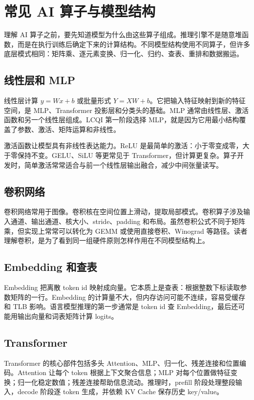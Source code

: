 \chapter{常见 AI 算子与模型结构}

理解 AI 算子之前，要先知道模型为什么由这些算子组成。推理引擎不是随意堆函数，而是在执行训练后确定下来的计算结构。不同模型结构使用不同算子，但许多底层模式相同：矩阵乘、逐元素变换、归一化、归约、查表、重排和数据搬运。

\section{线性层和 MLP}

线性层计算 $y = Wx + b$ 或批量形式 $Y = XW + b$。它把输入特征映射到新的特征空间，是 MLP、Transformer 投影层和分类头的基础。MLP 通常由线性层、激活函数和另一个线性层组成。LCQI 第一阶段选择 MLP，就是因为它用最小结构覆盖了参数、激活、矩阵运算和非线性。

激活函数让模型具有非线性表达能力。ReLU 是最简单的激活：小于零变成零，大于零保持不变。GELU、SiLU 等更常见于 Transformer，但计算更复杂。算子开发时，简单激活常常适合与前一个线性层输出融合，减少中间张量读写。

\section{卷积网络}

卷积网络常用于图像。卷积核在空间位置上滑动，提取局部模式。卷积算子涉及输入通道、输出通道、核大小、stride、padding 和布局。虽然卷积公式不同于矩阵乘，但实现上常常可以转化为 GEMM 或使用直接卷积、Winograd 等路径。读者理解卷积，是为了看到同一组硬件原则怎样作用在不同模型结构上。

\section{Embedding 和查表}

Embedding 把离散 token id 映射成向量。它本质上是查表：根据整数下标读取参数矩阵的一行。Embedding 的计算量不大，但内存访问可能不连续，容易受缓存和 TLB 影响。语言模型推理的第一步通常是 token id 查 Embedding，最后还可能用输出向量和词表矩阵计算 logits。

\section{Transformer}

Transformer 的核心部件包括多头 Attention、MLP、归一化、残差连接和位置编码。Attention 让每个 token 根据上下文聚合信息；MLP 对每个位置做特征变换；归一化稳定数值；残差连接帮助信息流动。推理时，prefill 阶段处理整段输入，decode 阶段逐 token 生成，并依赖 KV Cache 保存历史 key/value。

